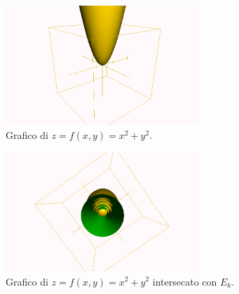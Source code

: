 \begin{example}
    \begin{figure}
    \centering
    \includegraphics[width=0.65\textwidth]{Analisi2/figures/E_k_3D.jpg}
        \caption{Grafico di $z=f(x,y)=x^2+y^2$.}\label{fig:E_k_3D}
    \end{figure}
    
    \begin{figure}
    \centering
    \includegraphics[width=0.65\textwidth]{Analisi2/figures/E_k_3D_1.jpg}
        \caption{Grafico di $z=f(x,y)=x^2+y^2$ intersecato con $E_k$.}\label{fig:E_k_3D_1}
    \end{figure}
\end{example}

